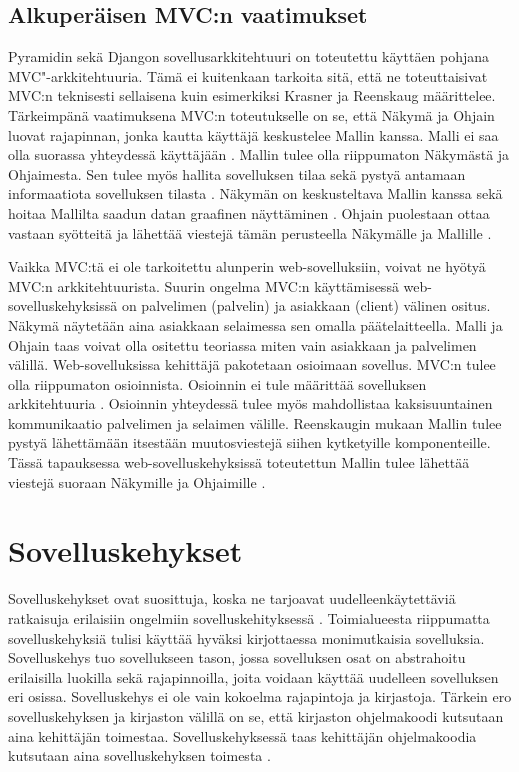 \documentclass[utf8]{gradu3}
\begin{document}
\section{Alkuperäisen MVC:n vaatimukset}
Pyramidin sekä Djangon sovellusarkkitehtuuri on toteutettu käyttäen pohjana MVC"-arkkitehtuuria. Tämä ei kuitenkaan tarkoita sitä, että ne toteuttaisivat MVC:n teknisesti sellaisena kuin esimerkiksi Krasner \parencite{krasner_desc} ja Reenskaug \parencite{reenskaug_tools} määrittelee. Tärkeimpänä vaatimuksena MVC:n toteutukselle on se, että Näkymä ja Ohjain luovat rajapinnan, jonka kautta käyttäjä keskustelee Mallin kanssa. Malli ei saa olla suorassa yhteydessä käyttäjään \parencite[s. 10]{reenskaug_tools}. Mallin tulee olla riippumaton Näkymästä ja Ohjaimesta. Sen tulee myös hallita sovelluksen tilaa sekä pystyä antamaan informaatiota sovelluksen tilasta \parencite{burbeck}. Näkymän on keskusteltava Mallin kanssa sekä hoitaa Mallilta saadun datan graafinen näyttäminen \parencite[s.1]{reenskaug_orig}. Ohjain puolestaan ottaa vastaan syötteitä ja lähettää viestejä tämän perusteella Näkymälle ja Mallille \parencite{burbeck}.

Vaikka MVC:tä ei ole tarkoitettu alunperin web-sovelluksiin, voivat ne hyötyä MVC:n arkkitehtuurista. Suurin ongelma MVC:n käyttämisessä web-sovelluskehyksissä on palvelimen (palvelin) ja asiakkaan (client) välinen ositus. Näkymä näytetään aina asiakkaan selaimessa sen omalla päätelaitteella. Malli ja Ohjain taas voivat olla ositettu teoriassa miten vain asiakkaan ja palvelimen välillä. Web-sovelluksissa kehittäjä pakotetaan osioimaan sovellus. MVC:n tulee olla riippumaton osioinnista. Osioinnin ei tule määrittää sovelluksen arkkitehtuuria \parencite{ibm_watson}. Osioinnin yhteydessä tulee myös mahdollistaa kaksisuuntainen kommunikaatio palvelimen ja selaimen välille. Reenskaugin mukaan Mallin tulee pystyä lähettämään itsestään muutosviestejä siihen kytketyille komponenteille. Tässä tapauksessa web-sovelluskehyksissä toteutettun Mallin tulee lähettää viestejä suoraan Näkymille ja Ohjaimille \parencite{reenskaug_tools}. 

\chapter{Sovelluskehykset}
Sovelluskehykset ovat suosittuja, koska ne tarjoavat uudelleenkäytettäviä ratkaisuja erilaisiin ongelmiin sovelluskehityksessä \parencite{towards_framework}. Toimialueesta riippumatta sovelluskehyksiä tulisi käyttää hyväksi kirjottaessa monimutkaisia sovelluksia. Sovelluskehys tuo sovellukseen tason, jossa sovelluksen osat on abstrahoitu erilaisilla luokilla sekä rajapinnoilla, joita voidaan käyttää uudelleen sovelluksen eri osissa. Sovelluskehys ei ole vain kokoelma rajapintoja ja kirjastoja\parencite{towards_framework}. Tärkein ero sovelluskehyksen ja kirjaston välillä on se, että kirjaston ohjelmakoodi kutsutaan aina
kehittäjän toimestaa. Sovelluskehyksessä taas kehittäjän ohjelmakoodia kutsutaan aina sovelluskehyksen toimesta \parencite{pyramid_intr}.
\end{document}

